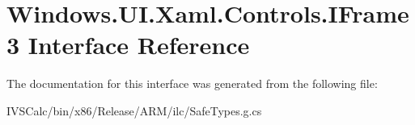 \hypertarget{interface_windows_1_1_u_i_1_1_xaml_1_1_controls_1_1_i_frame3}{}\section{Windows.\+U\+I.\+Xaml.\+Controls.\+I\+Frame3 Interface Reference}
\label{interface_windows_1_1_u_i_1_1_xaml_1_1_controls_1_1_i_frame3}


The documentation for this interface was generated from the following file\+:\begin{DoxyCompactItemize}
\item 
I\+V\+S\+Calc/bin/x86/\+Release/\+A\+R\+M/ilc/Safe\+Types.\+g.\+cs\end{DoxyCompactItemize}
